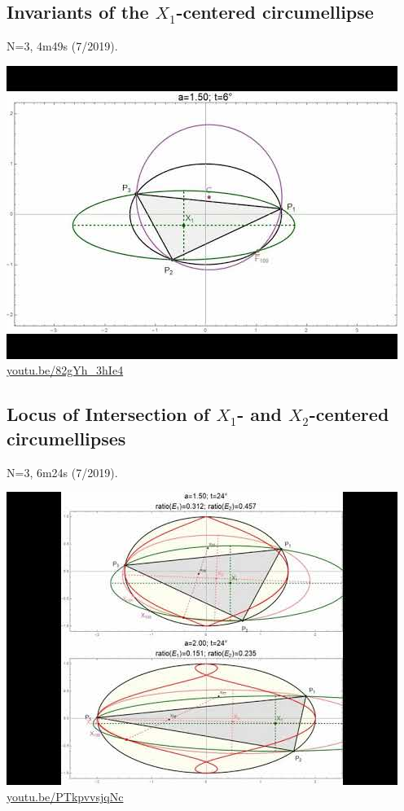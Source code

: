 \documentclass[12pt]{amsart}
\begin{document}
\subsection{Invariants of the $X_{1}$-centered circumellipse}
\label{vid:82gYh_3hIe4}
\noindent N=3, 4m49s (7/2019). 
\begin{center}\includegraphics[width=.5\textwidth]{pics/82gYh_3hIe4.jpg} \\ 
\href{https://youtu.be/82gYh_3hIe4}{\url{youtu.be/82gYh\_3hIe4}}\end{center}
% 

\subsection{Locus of Intersection of $X_{1}$- and $X_{2}$-centered circumellipses}
\label{vid:PTkpvvsjqNc}
\noindent N=3, 6m24s (7/2019). 
\begin{center}\includegraphics[width=.5\textwidth]{pics/PTkpvvsjqNc.jpg} \\ 
\href{https://youtu.be/PTkpvvsjqNc}{\url{youtu.be/PTkpvvsjqNc}}\end{center}
% 
\end{document}
